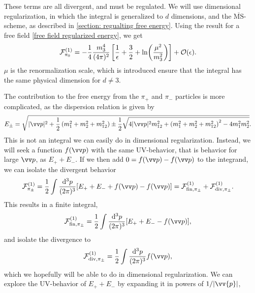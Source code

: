 These terms are all divergent, and must be regulated. 
We will use dimensional regularization, in which the integral is generalized to $d$ dimensions, and the $\overline{\mathrm{MS}}$-scheme, as described in \autoref{section: regualting free energy}.
Using the result for a free field \cref{free field regularized energy}, we get
\begin{equation}
    \mathcal{F}^{(1)}_{\pi_0} 
    = 
    - \frac{1}{4} \frac{m_3^4}{(4\pi)^2} 
    \left[ \frac{1}{\epsilon} + \frac{3}{2} + \ln(\frac{\mu^2}{m_3^2}) \right] + \mathcal{O}(\epsilon).
\end{equation}
$\mu$ is the renormalization scale, which is introduced ensure that the integral has the same physical dimension for $d \neq 3$.

The contribution to the free energy from the $\pi_+$ and $\pi_-$ particles is more complicated, as the dispersion relation is given by
\begin{equation}
    E_\pm
    = 
    \sqrt{
        |\vv p|^2 +
        \frac{1}{2}
        \left(
            m_1^2 + m_2^2 + m_{12}^2 
        \right)
        \pm 
        \frac{1}{2}
        \sqrt{
            4|\vv p|^2m_{12}^2 
            +
            \left(
                m_1^2 + m_2^2 + m_{12}^2
            \right)^2
            - 4 m_1^2 m_2^2
        }
    }.
\end{equation}
This is not an integral we can easily do in dimensional regularization.
Instead, we will seek a function $f(\vv p)$ with the same UV-behavior, that is behavior for large $\vv p$, as $E_+ + E_-$.
If we then add $0 = f(\vv p) - f(\vv p)$ to the integrand, we can isolate the divergent behavior
\begin{equation}
    \Ef_{\pi_\pm}^{(1)}
    = 
    \frac{1}{2} \int \frac{\dd^3 p}{(2\pi)^3} [E_+ + E_- + f(\vv p) - f(\vv p)]
    = \Ef^{(1)}_{\mathrm{fin}, \pi_\pm } + \Ef^{(1)}_{\mathrm{div}, \pi_\pm}.
\end{equation}
This results in a finite integral, 
\begin{equation}
    \Ef^{(1)}_{\mathrm{fin}, \pi_\pm } = \frac{1}{2} \int \frac{\dd^3 p}{(2\pi)^3} [E_+ + E_- - f(\vv p)],
\end{equation}
and isolate the divergence to
\begin{equation}
    \Ef^{(1)}_{\mathrm{div}, \pi_\pm }
    = 
    \frac{1}{2} \int \frac{\dd^3 p}{(2\pi)^3} f(\vv p),
\end{equation}
which we hopefully will be able to do in dimensional regularization.
We can explore the UV-behavior of $E_+ + E_-$ by expanding it in powers of $1 / \abs{\vv{p}}$,
